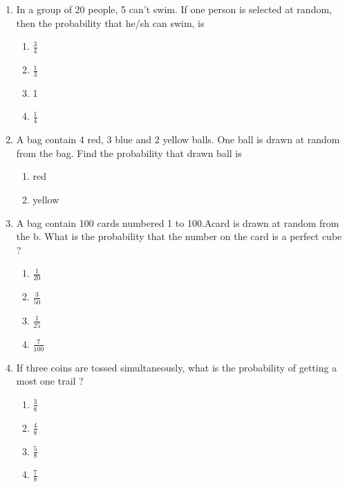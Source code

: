 \begin{enumerate}[label=\thesection.\arabic*.,ref=\thesection.\theenumi]
\begin{enumerate}
                        \end{enumerate}
        \item In a group of 20 people, 5 can't swim. If one person is selected at random, then the probability that he/sh can swim, is
                        \begin{enumerate}
                                \item $ \frac {3} {4} $
                                \item $ \frac {1} {3} $
                                \item 1
                                \item $ \frac {1} {4} $
                        \end{enumerate}
        \item A bag contain 4 red, 3 blue and 2 yellow balls. One ball is drawn at random from the bag. Find the probability that drawn ball is
                \begin{enumerate}
                                        \item red
                                        \item yellow
                \end{enumerate}
        \item A bag contain 100 cards numbered 1 to 100.Acard is drawn at random from the b. What is the probability that the number on the card is a perfect cube ?
                        \begin{enumerate}
                                \item $ \frac {1} {20} $
                                \item $ \frac {3} {50} $
                                \item $ \frac {1} {25} $
                                \item $ \frac {7} {100} $
                        \end{enumerate}
        \item If three coins are tossed simultaneously, what is the probability of getting a most one trail ?
                        \begin{enumerate}
                                \item $ \frac {3} {8} $
                                \item $ \frac {4} {8} $
                                \item $ \frac {5} {8} $
                                \item $ \frac {7} {8} $

\end{enumerate}
\end{enumerate}
